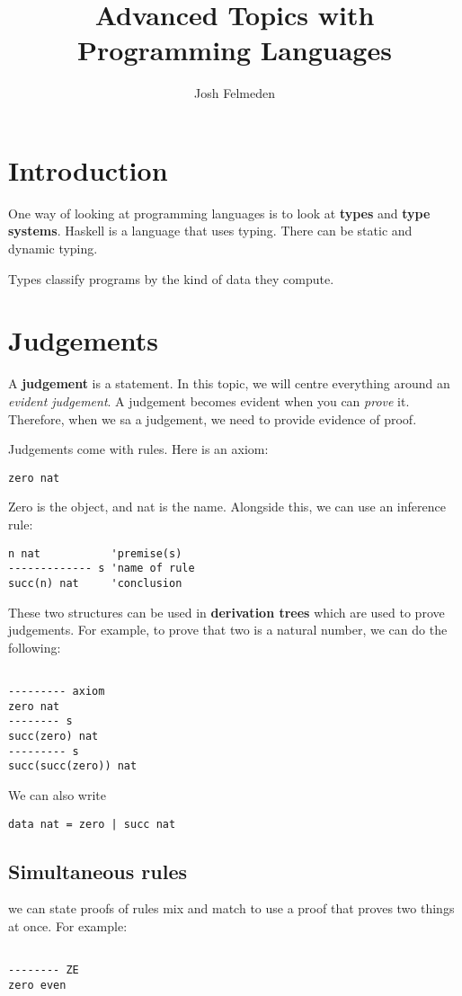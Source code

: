 \documentclass[11pt,a4paper,titlepage,dvipsnames,cmyk]{scrartcl}
\title{Advanced Topics with Programming Languages}
\author{Josh Felmeden}
\begin{document}
\maketitle
\tableofcontents
\newpage

\section{Introduction}
One way of looking at programming languages is to look at \textbf{types} and \textbf{type systems}. Haskell is a language that uses typing. There can be static and dynamic typing.

Types classify programs by the kind of data they compute.

\section{Judgements}
A \textbf{judgement} is a statement. In this topic, we will centre everything around an \textit{evident judgement}. A judgement becomes evident when you can \textit{prove} it. Therefore, when we sa a judgement, we need to provide evidence of proof.

Judgements come with rules. Here is an axiom:
\begin{lstlisting}
zero nat
\end{lstlisting}

Zero is the object, and nat is the name. Alongside this, we can use an inference rule:
\begin{lstlisting}
n nat           'premise(s)
------------- s 'name of rule
succ(n) nat     'conclusion
\end{lstlisting}

These two structures can be used in \textbf{derivation trees} which are used to prove judgements. For example, to prove that two is a natural number, we can do the following:
\begin{lstlisting}

--------- axiom
zero nat
-------- s
succ(zero) nat
--------- s
succ(succ(zero)) nat
\end{lstlisting}

We can also write
\begin{lstlisting}
data nat = zero | succ nat
\end{lstlisting}

\subsection{Simultaneous rules}
we can state proofs of rules mix and match to use a proof that proves two things at once. For example:
\begin{lstlisting}

-------- ZE
zero even
\end{lstlisting}
\end{document}
